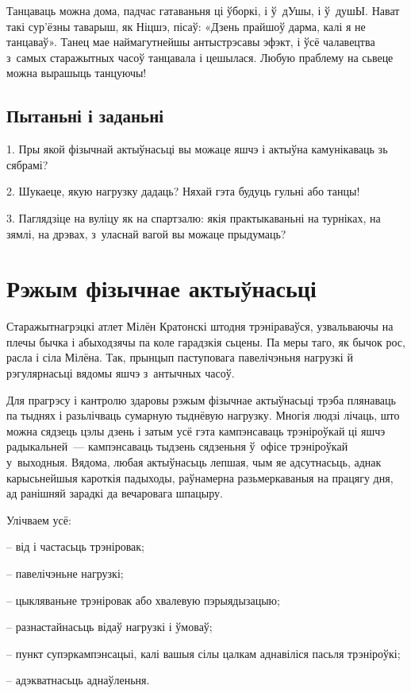 Танцаваць можна дома, падчас гатаваньня ці ўборкі, і ў~дУшы, і ў~душЫ. Нават такі сур'ёзны таварыш, як Ніцшэ, пісаў: «Дзень прайшоў дарма, калі я не танцаваў». Танец мае наймагутнейшы антыстрэсавы эфэкт, і ўсё чалавецтва з~самых старажытных часоў танцавала і цешылася. Любую праблему на сьвеце можна вырашыць танцуючы!

\subsection*{Пытаньні і заданьні}

1. Пры якой фізычнай актыўнасьці вы можаце яшчэ і актыўна камунікаваць зь сябрамі?

2. Шукаеце, якую нагрузку дадаць? Няхай гэта будуць гульні або танцы!

3. Паглядзіце на вуліцу як на спартзалю: якія практыкаваньні на турніках, на зямлі, на дрэвах, з~уласнай вагой вы можаце прыдумаць?


\section{Рэжым фізычнае актыўнасьці}

Старажытнагрэцкі атлет Мілён Кратонскі штодня трэніраваўся, узвальваючы на плечы бычка і абыходзячы па коле гарадзкія сьцены. Па меры таго, як бычок рос, расла і сіла Мілёна. Так, прынцып паступовага павелічэньня нагрузкі й рэгулярнасьці вядомы яшчэ з~антычных часоў.

Для прагрэсу і кантролю здаровы рэжым фізычнае актыўнасьці трэба плянаваць па тыднях і разьлічваць сумарную тыднёвую нагрузку. Многія людзі лічаць, што можна сядзець цэлы дзень і затым усё гэта кампэнсаваць трэніроўкай ці яшчэ радыкальней~--- кампэнсаваць тыдзень сядзеньня ў~офісе трэніроўкай у~выходныя. Вядома, любая актыўнасьць лепшая, чым яе адсутнасьць, аднак карысьнейшыя кароткія падыходы, раўнамерна разьмеркаваныя на працягу дня, ад ранішняй зарадкі да вечаровага шпацыру.

Улічваем усё: 

– від і частасьць трэніровак; 

– павелічэньне нагрузкі; 

– цыкляваньне трэніровак або хвалевую пэрыядызацыю; 

– разнастайнасьць відаў нагрузкі і ўмоваў; 

– пункт супэркампэнсацыі, калі вашыя сілы цалкам аднавіліся пасьля трэніроўкі;

– адэкватнасьць аднаўленьня.


